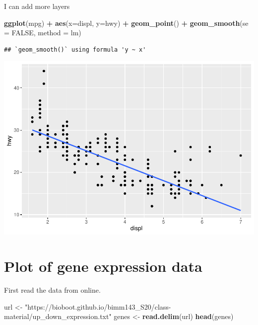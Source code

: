 \documentclass[
]{article}
\newenvironment{Shaded}{\begin{snugshade}}{\end{snugshade}}
\newcommand{\DataTypeTok}[1]{\textcolor[rgb]{0.13,0.29,0.53}{#1}}
\newcommand{\KeywordTok}[1]{\textcolor[rgb]{0.13,0.29,0.53}{\textbf{#1}}}
\newcommand{\NormalTok}[1]{#1}
\newcommand{\OperatorTok}[1]{\textcolor[rgb]{0.81,0.36,0.00}{\textbf{#1}}}
\newcommand{\OtherTok}[1]{\textcolor[rgb]{0.56,0.35,0.01}{#1}}
\newcommand{\StringTok}[1]{\textcolor[rgb]{0.31,0.60,0.02}{#1}}
\begin{document}
I can add more layers

\begin{Shaded}
\begin{Highlighting}[]
\KeywordTok{ggplot}\NormalTok{(mpg) }\OperatorTok{+}\StringTok{ }
\StringTok{  }\KeywordTok{aes}\NormalTok{(}\DataTypeTok{x=}\NormalTok{displ, }\DataTypeTok{y=}\NormalTok{hwy) }\OperatorTok{+}\StringTok{ }
\StringTok{  }\KeywordTok{geom_point}\NormalTok{() }\OperatorTok{+}
\StringTok{  }\KeywordTok{geom_smooth}\NormalTok{(}\DataTypeTok{se =} \OtherTok{FALSE}\NormalTok{, }\DataTypeTok{method =}\NormalTok{ lm)}
\end{Highlighting}
\end{Shaded}

\begin{verbatim}
## `geom_smooth()` using formula 'y ~ x'
\end{verbatim}

\includegraphics{class05_files/figure-latex/unnamed-chunk-4-1.pdf}

\hypertarget{plot-of-gene-expression-data}{%
\section{Plot of gene expression
data}\label{plot-of-gene-expression-data}}

First read the data from online.

\begin{Shaded}
\begin{Highlighting}[]
\NormalTok{url <-}\StringTok{ "https://bioboot.github.io/bimm143_S20/class-material/up_down_expression.txt"}
\NormalTok{genes <-}\StringTok{ }\KeywordTok{read.delim}\NormalTok{(url)}
\KeywordTok{head}\NormalTok{(genes)}
\end{Highlighting}
\end{Shaded}
\end{document}
